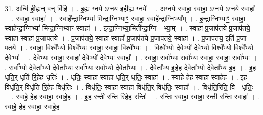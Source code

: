 \documentclass[17pt]{extarticle}
\begin{document}
31. अन्वि॑ ही॒ह्यन् वन् वि॑हि । . इ॒ह्य॒ ग्नये॒ ऽग्नय॑ इहीह्य॒ ग्नये᳚ । . अ॒ग्नये॒ स्वाहा॒ स्वाहा॒ ऽग्नये॒ ऽग्नये॒ स्वाहा᳚ । . स्वाहा॒ स्वाहा᳚ । . स्वाहे᳚न्द्रा॒ग्निभ्या॑ मिन्द्रा॒ग्निभ्याꣳ॒॒ स्वाहा॒ स्वाहे᳚न्द्रा॒ग्निभ्या᳚म् । . इ॒न्द्रा॒ग्निभ्याꣳ॒॒ स्वाहा॒ स्वाहे᳚न्द्रा॒ग्निभ्या॑ मिन्द्रा॒ग्निभ्याꣳ॒॒ स्वाहा᳚ । . इ॒न्द्रा॒ग्निभ्या॒मिती᳚न्द्रा॒ग्नि - भ्या॒म् । . स्वाहा᳚ प्र॒जाप॑तये प्र॒जाप॑तये॒ स्वाहा॒ स्वाहा᳚ प्र॒जाप॑तये । . प्र॒जाप॑तये॒ स्वाहा॒ स्वाहा᳚ प्र॒जाप॑तये प्र॒जाप॑तये॒ स्वाहा᳚ । . प्र॒जाप॑तय॒ इति॑ प्र॒जा - प॒त॒ये॒ । . स्वाहा॒ विश्वे᳚भ्यो॒ विश्वे᳚भ्यः॒ स्वाहा॒ स्वाहा॒ विश्वे᳚भ्यः । . विश्वे᳚भ्यो दे॒वेभ्यो॑ दे॒वेभ्यो॒ विश्वे᳚भ्यो॒ विश्वे᳚भ्यो दे॒वेभ्यः॑ । . दे॒वेभ्यः॒ स्वाहा॒ स्वाहा॑ दे॒वेभ्यो॑ दे॒वेभ्यः॒ स्वाहा᳚ । . स्वाहा॒ सर्वा᳚भ्यः॒ सर्वा᳚भ्यः॒ स्वाहा॒ स्वाहा॒ सर्वा᳚भ्यः । . सर्वा᳚भ्यो दे॒वेता᳚भ्यो दे॒वेता᳚भ्यः॒ सर्वा᳚भ्यः॒ सर्वा᳚भ्यो दे॒वेता᳚भ्यः । . दे॒वेता᳚भ्य इ॒हेह दे॒वेता᳚भ्यो दे॒वेता᳚भ्य इ॒ह । . इ॒ह धृति॒र् धृति॑ रि॒हेह धृतिः॑ । . धृतिः॒ स्वाहा॒ स्वाहा॒ धृति॒र् धृतिः॒ स्वाहा᳚ । . स्वाहे॒ हेह स्वाहा॒ स्वाहे॒ह । . इ॒ह विधृ॑ति॒र् विधृ॑ति रि॒हेह विधृ॑तिः । . विधृ॑तिः॒ स्वाहा॒ स्वाहा॒ विधृ॑ति॒र् विधृ॑तिः॒ स्वाहा᳚ । . विधृ॑ति॒रिति॒ वि - धृ॒तिः॒ । . स्वाहे॒ हेह स्वाहा॒ स्वाहे॒ह । . इ॒ह रन्ती॒ रन्ति॑ रि॒हेह रन्तिः॑ । . रन्तिः॒ स्वाहा॒ स्वाहा॒ रन्ती॒ रन्तिः॒ स्वाहा᳚ । . स्वाहे॒ हेह स्वाहा॒ स्वाहे॒ह । \newline
\end{document}
